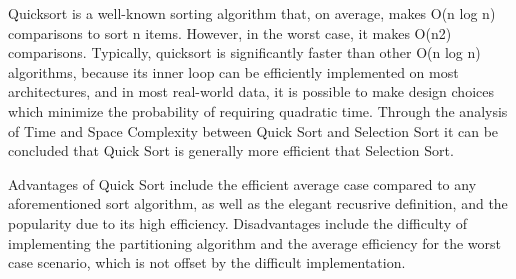 \documentclass[12pt]{article}
\begin{document}
\par 
Quicksort is a well-known sorting algorithm  that, on average, makes O(n log n) comparisons to sort n items. However, in the worst case, it makes O(n2) comparisons. Typically, quicksort is significantly faster than other O(n log n) algorithms, because its inner loop can be efficiently implemented on most architectures, and in most real-world data, it is possible to make design choices which minimize the probability of requiring quadratic time. Through the analysis of Time and Space Complexity between Quick Sort and Selection Sort it can be concluded that Quick Sort is generally more efficient that Selection Sort.
\par  Advantages of Quick Sort  include the efficient average case compared to any aforementioned sort algorithm, as well as the elegant recusrive definition, and the popularity due to its high efficiency. Disadvantages include the difficulty of implementing the partitioning algorithm and the average efficiency for the worst case scenario, which is not offset by the difficult implementation. 
 \newpage
\medskip



\printindex
\end{document}
